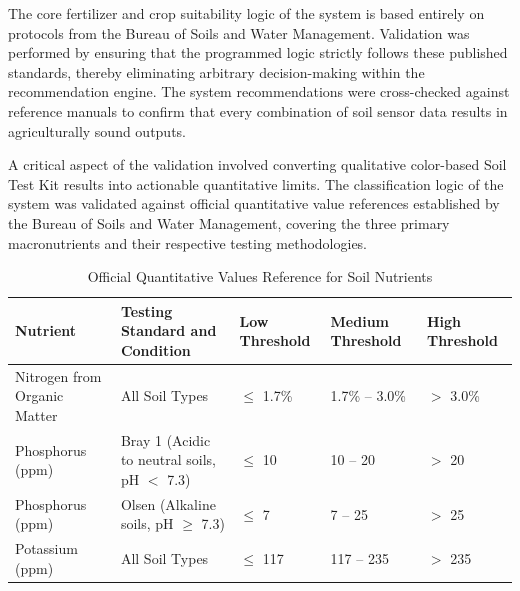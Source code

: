 {	The core fertilizer and crop suitability logic of the system is based entirely on protocols from the Bureau of Soils and Water Management. Validation was performed by ensuring that the programmed logic strictly follows these published standards, thereby eliminating arbitrary decision-making within the recommendation engine. The system recommendations were cross-checked against reference manuals to confirm that every combination of soil sensor data results in agriculturally sound outputs.
	
	A critical aspect of the validation involved converting qualitative color-based Soil Test Kit results into actionable quantitative limits. The classification logic of the system was validated against official quantitative value references established by the Bureau of Soils and Water Management, covering the three primary macronutrients and their respective testing methodologies.
	
	\begin{table}[H]
		\centering
		\caption{Official Quantitative Values Reference for Soil Nutrients}
		\label{tab:soil_nutrient_reference}
		
		\small
		\renewcommand{\arraystretch}{1.2}
		
		\begin{tabularx}{\textwidth}{p{3.5cm} p{4.5cm} X X X}
			\toprule
			\textbf{Nutrient} & \textbf{Testing Standard and Condition} & \textbf{Low Threshold} & \textbf{Medium Threshold} & \textbf{High Threshold} \\
			\midrule
			
			Nitrogen from Organic Matter &
			All Soil Types &
			$\leq$ 1.7\% &
			1.7\% -- 3.0\% &
			$>$ 3.0\% \\
			
			\addlinespace[6pt]
			
			Phosphorus (ppm) &
			Bray 1 (Acidic to neutral soils, pH $<$ 7.3) &
			$\leq$ 10 &
			10 -- 20 &
			$>$ 20 \\
			
			\addlinespace[6pt]
			
			Phosphorus (ppm) &
			Olsen (Alkaline soils, pH $\geq$ 7.3) &
			$\leq$ 7 &
			7 -- 25 &
			$>$ 25 \\
			
			\addlinespace[6pt]
			
			Potassium (ppm) &
			All Soil Types &
			$\leq$ 117 &
			117 -- 235 &
			$>$ 235 \\
			
			\bottomrule
		\end{tabularx}
		

\end{table}}
